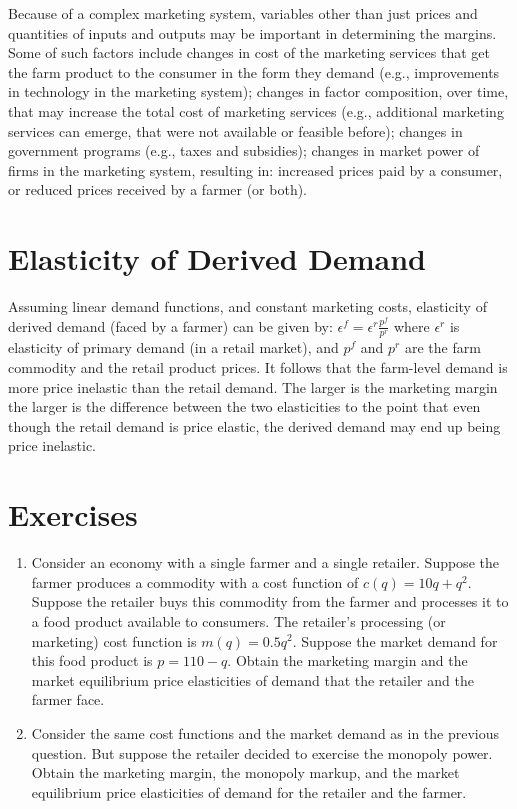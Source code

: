 \documentclass[
  oneside]{book}
\providecommand{\tightlist}{%
  \setlength{\itemsep}{0pt}\setlength{\parskip}{0pt}}
\begin{document}
Because of a complex marketing system, variables other than just prices and quantities of inputs and outputs may be important in determining the margins. Some of such factors include changes in cost of the marketing services that get the farm product to the consumer in the form they demand (e.g., improvements in technology in the marketing system); changes in factor composition, over time, that may increase the total cost of marketing services (e.g., additional marketing services can emerge, that were not available or feasible before); changes in government programs (e.g., taxes and subsidies); changes in market power of firms in the marketing system, resulting in: increased prices paid by a consumer, or reduced prices received by a farmer (or both).

\hypertarget{elasticity-of-derived-demand}{%
\section{Elasticity of Derived Demand}\label{elasticity-of-derived-demand}}

Assuming linear demand functions, and constant marketing costs, elasticity of derived demand (faced by a farmer) can be given by: \(\epsilon^f = \epsilon^r\frac{p^f}{p^r}\) where \(\epsilon^r\) is elasticity of primary demand (in a retail market), and \(p^f\) and \(p^r\) are the farm commodity and the retail product prices. It follows that the farm-level demand is more price inelastic than the retail demand. The larger is the marketing margin the larger is the difference between the two elasticities to the point that even though the retail demand is price elastic, the derived demand may end up being price inelastic.

\hypertarget{exercises-2}{%
\section*{Exercises}\label{exercises-2}}

\begin{enumerate}
\def\labelenumi{\arabic{enumi}.}
\tightlist
\item
  Consider an economy with a single farmer and a single retailer. Suppose the farmer produces a commodity with a cost function of \(c(q) = 10q+q^2\). Suppose the retailer buys this commodity from the farmer and processes it to a food product available to consumers. The retailer's processing (or marketing) cost function is \(m(q) = 0.5q^2\). Suppose the market demand for this food product is \(p=110-q\). Obtain the marketing margin and the market equilibrium price elasticities of demand that the retailer and the farmer face.
\item
  Consider the same cost functions and the market demand as in the previous question. But suppose the retailer decided to exercise the monopoly power. Obtain the marketing margin, the monopoly markup, and the market equilibrium price elasticities of demand for the retailer and the farmer.
\end{enumerate}
\end{document}

